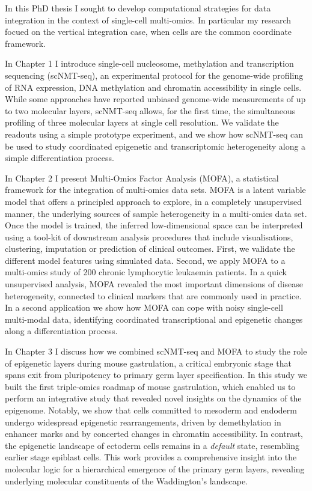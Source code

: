 In this PhD thesis I sought to develop computational strategies for data integration in the context of single-cell multi-omics. In particular my research focued on the vertical integration case, when cells are the common coordinate framework.

In Chapter 1 I introduce single-cell nucleosome, methylation and transcription sequencing (scNMT-seq), an experimental protocol for the genome-wide profiling of RNA expression, DNA methylation and chromatin accessibility in single cells. While some approaches have reported unbiased genome-wide measurements of up to two molecular layers, scNMT-seq allows, for the first time, the simultaneous profiling of three molecular layers at single cell resolution. We validate the readouts using a simple prototype experiment, and we show how scNMT-seq can be used to study coordinated epigenetic and transcriptomic heterogeneity along a simple differentiation process.

In Chapter 2 I present Multi-Omics Factor Analysis (MOFA), a statistical framework for the integration of multi-omics data sets. MOFA is a latent variable model that offers a principled approach to explore, in a completely unsupervised manner, the underlying sources of sample heterogeneity in a multi-omics data set. Once the model is trained, the inferred low-dimensional space can be interpreted using a tool-kit of downstream analysis procedures that include visualisations, clustering, imputation or prediction of clinical outcomes. First, we validate the different model features using simulated data. Second, we apply MOFA to a multi-omics study of 200 chronic lymphocytic leukaemia patients. In a quick unsupervised analysis, MOFA revealed the most important dimensions of disease heterogeneity, connected to clinical markers that are commonly used in practice. In a second application we show how MOFA can cope with noisy single-cell multi-modal data, identifying coordinated transcriptional and epigenetic changes along a differentiation process.

In Chapter 3 I discuss how we combined scNMT-seq and MOFA to study the role of epigenetic layers during mouse gastrulation, a critical embryonic stage that spans exit from pluripotency to primary germ layer specification. In this study we built the first triple-omics roadmap of mouse gastrulation, which enabled us to perform an integrative study that revealed novel insights on the dynamics of the epigenome. Notably, we show that cells committed to mesoderm and endoderm undergo widespread epigenetic rearrangements, driven by demethylation in enhancer marks and by concerted changes in chromatin accessibility. In contrast, the epigenetic landscape of ectoderm cells remains in a \textit{default} state, resembling earlier stage epiblast cells. This work provides a comprehensive insight into the molecular logic for a hierarchical emergence of the primary germ layers, revealing underlying molecular constituents of the Waddington's landscape.


